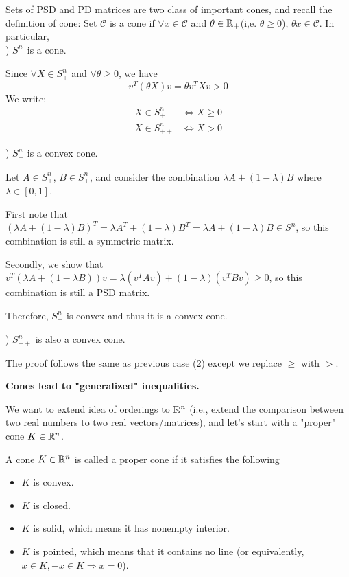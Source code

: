 Sets of PSD and PD matrices are two class of important cones, and recall the definition of cone: Set $\mathcal{C}$ is a cone if $\forall x\in \mathcal{C}$ and $\theta \in \mathbb{R}_{+}$(i,e. $\theta \geq 0$), $\theta x\in \mathcal{C}$. In particular,  \\ 

\vspace{0.2cm}
) $S_+^n$ is a cone.

Since $\forall X \in S_+^n$ and $\forall \theta \geq 0$, we have
$$v^T(\theta X)v = \theta v^TXv  > 0$$
We write:
\begin{align*}
X\in S^n_+ &\Leftrightarrow X\geq 0\\
X\in S^n_{++} &\Leftrightarrow X> 0
\end{align*}

\vspace{0.2cm}
) $S_+^n$ is a convex cone.

Let $A\in S^n_+$, $B\in S^n_+$, and consider the combination $\lambda A + (1-\lambda)B$ where $\lambda \in [0,1]$.

First note that $(\lambda A + (1-\lambda)B)^T= \lambda A^T + (1-\lambda)B^T = \lambda A + (1-\lambda)B \in S^n$, so this combination is still a symmetric matrix.

Secondly, we show that $v^T(\lambda A + (1-\lambda B))v =\lambda(v^TAv) + (1-\lambda)(v^TBv)\geq 0$, so this combination is still a PSD matrix. 

Therefore, $S_+^n$ is convex and thus it is a convex cone.

\vspace{0.2cm}
) $S^n_{++}$ is also a convex cone. 

The proof follows the same as previous case (2) except we replace $\geq$ with $>$.



\vspace{0.3cm}
\textbf{Cones lead to "generalized" inequalities.}

We want to extend idea of orderings to $\mathbb{R}^n$ (i.e., extend the comparison between two real numbers to two real vectors/matrices), and let's start with a "proper" cone $K\in \mathbb{R}^n$. 

\begin{definition}
A cone $K\in \mathbb{R}^n$ is called a proper cone if it satisfies the following
\begin{itemize}
	\item $K$ is convex.
	\item $K$ is closed. 
	\item $K$ is solid, which means it has nonempty interior.
	\item $K$ is pointed, which means that it contains no line (or equivalently, $x \in K, -x\in K \Rightarrow x=0$).
\end{itemize}
\end{definition}


